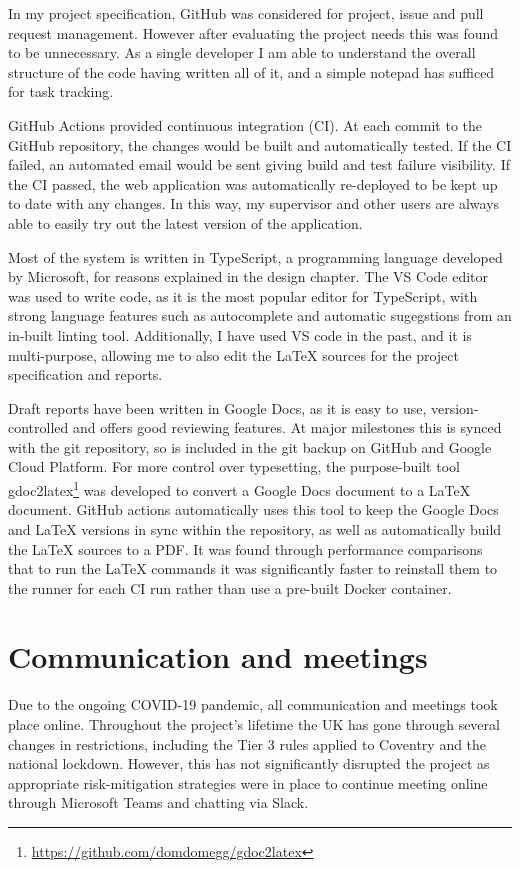\documentclass[a4paper,fleqn,twoside,12pt]{report}
\begin{document}
In my project specification, GitHub was considered for project, issue and pull request management. However after evaluating the project needs this was found to be unnecessary. As a single developer I am able to understand the overall structure of the code having written all of it, and a simple notepad has sufficed for task tracking.

GitHub Actions provided continuous integration (CI). At each commit to the GitHub repository, the changes would be built and automatically tested. If the CI failed, an automated email would be sent giving build and test failure visibility. If the CI passed, the web application was automatically re-deployed to be kept up to date with any changes. In this way, my supervisor and other users are always able to easily try out the latest version of the application.

Most of the system is written in TypeScript, a programming language developed by Microsoft, for reasons explained in the design chapter. The VS Code editor was used to write code, as it is the most popular editor for TypeScript, with strong language features such as autocomplete and automatic sugegstions from an in-built linting tool. Additionally, I have used VS code in the past, and it is multi-purpose, allowing me to also edit the LaTeX sources for the project specification and reports.

Draft reports have been written in Google Docs, as it is easy to use, version-controlled and offers good reviewing features. At major milestones this is synced with the git repository, so is included in the git backup on GitHub and Google Cloud Platform. For more control over typesetting, the purpose-built tool gdoc2latex\footnote{\href{https://github.com/domdomegg/gdoc2latex}{https://github.com/domdomegg/gdoc2latex}} was developed to convert a Google Docs document to a LaTeX document. GitHub actions automatically uses this tool to keep the Google Docs and LaTeX versions in sync within the repository, as well as automatically build the LaTeX sources to a PDF. It was found through performance comparisons that to run the LaTeX commands it was significantly faster to reinstall them to the runner for each CI run rather than use a pre-built Docker container.
\section{Communication and meetings}\label{id:h.k8ippxnoat7q}
Due to the ongoing COVID-19 pandemic, all communication and meetings took place online. Throughout the project’s lifetime the UK has gone through several changes in restrictions, including the Tier 3 rules applied to Coventry and the national lockdown. However, this has not significantly disrupted the project as appropriate risk-mitigation strategies were in place to continue meeting online through Microsoft Teams and chatting via Slack.
\end{document}
